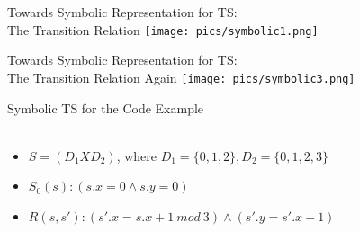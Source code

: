 \documentclass{beamer}
\begin{document}
\begin{frame}{Towards Symbolic Representation for TS:\\The Transition Relation}
\texttt{[image: pics/symbolic1.png]}
\end{frame}

\begin{frame}{Towards Symbolic Representation for TS:\\The Transition Relation Again}
\texttt{[image: pics/symbolic3.png]}
\end{frame}

\begin{frame}{Symbolic TS for the Code Example}
\hfill
{} \\
 \\
\begin{itemize}
\item<3-> $S = (D_1 X D_2)$, where $D_1 = \{0,1,2\}, D_2 = \{0,1,2,3\}$
\item<3-> $S_0(s): (s.x = 0 \land s.y =0)$
\item<3-> $R(s,s'): (s'.x = s.x+1~mod~3) \land (s'.y = s'.x + 1) $
\end{itemize}
\end{frame}
\end{document}

